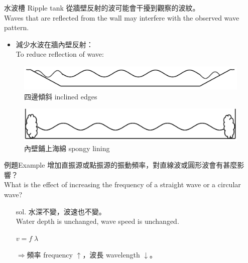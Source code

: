 \documentclass[beamer=true]{standalone}
\begin{document}
\begin{frame}{水波槽 Ripple tank}
    從牆壁反射的波可能會干擾到觀察的波紋。\\Waves that are reflected from the wall may interfere with the observed wave pattern.
    \begin{itemize}
        \item 減少水波在牆內壁反射：\\To reduce reflection of wave:
    \end{itemize}
    \begin{figure}
        \centering
        \includegraphics[width=.75\textwidth]{./img/ch2_cf_2024-05-24-13-54-59.png}
        \caption{四邊傾斜 inclined edges}

    \end{figure}
    \begin{figure}
        \centering
        \includegraphics[width=.7\textwidth]{./img/ch2_cf_2024-05-24-13-57-10.png}
        \caption{內壁鋪上海綿 spongy lining}

    \end{figure}
\end{frame}

\begin{frame}{例題Example}
    增加直振源或點振源的振動頻率，對直線波或圓形波會有甚麼影響？\\What is the effect of increasing the frequency of a straight wave or a circular wave?
    \bigskip
    \begin{itemize}
        \item [sol.] 水深不變，波速也不變。\\Water depth is unchanged, wave speed is unchanged.
        \item [] \(v=f\;\lambda\)\
        \item [] $\Rightarrow$頻率 frequency $\uparrow$，波長 wavelength  $\downarrow$。
    \end{itemize}

\end{frame}
\end{document}
